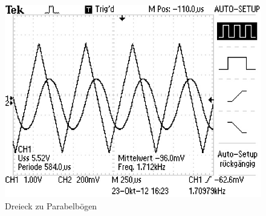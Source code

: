 \begin{figure}[H]
\includegraphics[height=0.4\textheight] {_pics/dreieck.JPG}
\centering
\caption {Dreieck zu Parabelbögen}
\end{figure}






